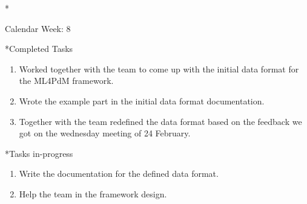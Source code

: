 \documentclass[11pt,a4paper]{article}
\begin{document}
\newpage
\begin{section}*{Calendar Week: 8  \hfill \date{26 February, 2021}}
 \begin{refsection}

       \begin{subsection}*{Completed Tasks}
             \begin{enumerate}
                   \item Worked together with the team to come up with the initial data format for the ML4PdM framework.
                   \item Wrote the example part in the initial data format documentation.
                   \item Together with the team redefined the data format based on the feedback we got on the wednesday meeting of 24 February.
             \end{enumerate}
       \end{subsection}

       \begin{subsection}*{Tasks in-progress}
             \begin{enumerate}
                   \item Write the documentation for the defined data format.
                   \item Help the team in the framework design.
             \end{enumerate}
       \end{subsection}

 \end{refsection}
\end{section}
\end{document}
